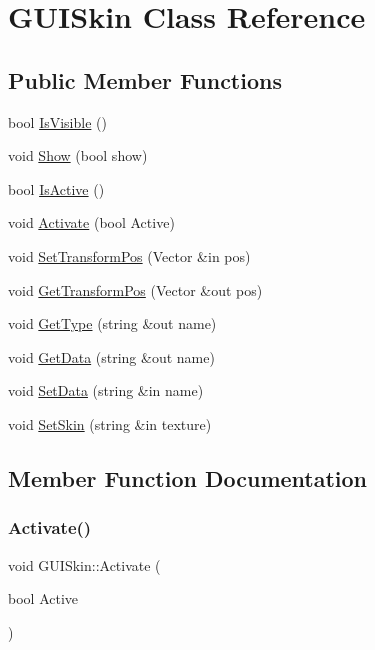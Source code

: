 \hypertarget{class_g_u_i_skin}{}\section{G\+U\+I\+Skin Class Reference}
\label{class_g_u_i_skin}
\subsection*{Public Member Functions}
\begin{DoxyCompactItemize}
\item 
bool \hyperlink{class_g_u_i_skin_a8ec0b4bdfbe48e725eb2edf887ae5b35}{Is\+Visible} ()
\item 
void \hyperlink{class_g_u_i_skin_a94b54b82c1587e9b63015e13b6c845ba}{Show} (bool show)
\item 
bool \hyperlink{class_g_u_i_skin_a7f735b1d191104140cf75b80e48cbf09}{Is\+Active} ()
\item 
void \hyperlink{class_g_u_i_skin_a160d231025968b463ee4776c1348571f}{Activate} (bool Active)
\item 
void \hyperlink{class_g_u_i_skin_ab4890e1885de02bb750790bc94561849}{Set\+Transform\+Pos} (Vector \&in pos)
\item 
void \hyperlink{class_g_u_i_skin_ace1952be2da072e0f1ad368c062abc1d}{Get\+Transform\+Pos} (Vector \&out pos)
\item 
void \hyperlink{class_g_u_i_skin_a3e12697ba2e794f3ee125fd78432dc00}{Get\+Type} (string \&out name)
\item 
void \hyperlink{class_g_u_i_skin_a5dac4c19b123e20be1a609e9744efcde}{Get\+Data} (string \&out name)
\item 
void \hyperlink{class_g_u_i_skin_a30841995921d05b436a86bc2393d7732}{Set\+Data} (string \&in name)
\item 
void \hyperlink{class_g_u_i_skin_ac4161997a904d92cf66d3d7ee0698110}{Set\+Skin} (string \&in texture)
\end{DoxyCompactItemize}


\subsection{Member Function Documentation}
\hypertarget{class_g_u_i_skin_a160d231025968b463ee4776c1348571f}{}\label{class_g_u_i_skin_a160d231025968b463ee4776c1348571f} 
\subsubsection{\texorpdfstring{Activate()}{Activate()}}
{\footnotesize\ttfamily void G\+U\+I\+Skin\+::\+Activate (\begin{DoxyParamCaption}\item[{bool}]{Active }\end{DoxyParamCaption})}

